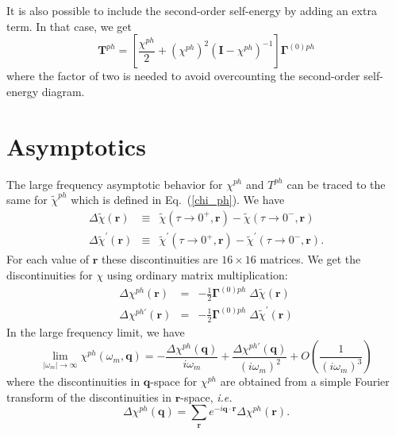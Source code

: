 It is also possible to include the second-order self-energy by
adding an extra term.  In that case, we get
\begin{equation}
\label{tph_def}
\mathbf{T}^{ph} = \left[\frac{\chi^{ph}}{2} +  
(\chi^{ph})^2 (\mathbf{I} - \chi^{ph})^{-1} \right]
\mathbf{\Gamma}^{(0)ph}
\end{equation}
where the factor of two is needed to avoid overcounting the
second-order self-energy diagram.

\section{Asymptotics}
The large frequency asymptotic behavior for $\chi^{ph}$ and
$T^{ph}$ can be traced to the same
for $\tilde{\chi}^{ph}$ which is defined in Eq.~(\ref{chi_ph}).
We have 
\begin{eqnarray}
\Delta \tilde{\chi}(\mathbf{r}) & \equiv &
\tilde{\chi}(\tau \to 0^+,\mathbf{r}) -
\tilde{\chi}(\tau \to 0^-,\mathbf{r}) \\
\Delta \tilde{\chi}^{\prime}(\mathbf{r}) & \equiv &
\tilde{\chi}^{\prime}(\tau \to 0^+,\mathbf{r}) -
\tilde{\chi}^{\prime}(\tau \to 0^-,\mathbf{r}).  
\end{eqnarray}
For each value of $\mathbf{r}$ these discontinuities are 
$16 \times 16$ matrices.
We get the discontinuities for $\chi$ using ordinary 
matrix multiplication:
\begin{eqnarray}
\Delta \chi^{ph}(\mathbf{r}) & = &
-\frac{1}{2} \mathbf{\Gamma}^{(0)ph}\;\Delta \tilde{\chi}(\mathbf{r}) \\
\Delta \chi^{ph \prime}(\mathbf{r}) & = &
-\frac{1}{2}\mathbf{\Gamma}^{(0)ph}\;\Delta \tilde{\chi}^{\prime}(\mathbf{r}) 
\end{eqnarray}
In the large frequency limit, we have
\begin{equation}
\label{kph_asy}
\lim_{|\omega_m| \to \infty}
\chi^{ph}(\omega_m, \mathbf{q})
= - \frac{\Delta \chi^{ph}(\mathbf{q})}{i \omega_m}
+ \frac{\Delta \chi^{ph \prime}(\mathbf{q})}{(i \omega_m)^2}
+ O \left( \frac{1}{(i \omega_m)^3} \right)
\end{equation}
where the discontinuities in $\mathbf{q}$-space for
$\chi^{ph}$ are obtained from a simple Fourier transform
of the discontinuities in $\mathbf{r}$-space, \textit{i.e.}
\begin{equation}
\Delta \chi^{ph}(\mathbf{q}) = \sum_{\mathbf{r}}
e^{-i \mathbf{q}\cdot\mathbf{r}}\Delta \chi^{ph}(\mathbf{r}).
\end{equation} 

